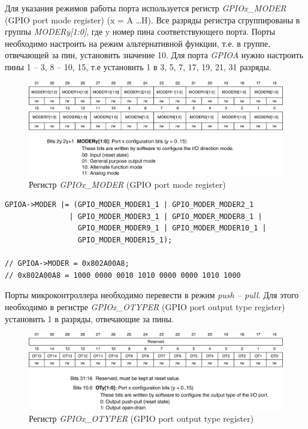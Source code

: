 	Для указания режимов работы порта используется регистр \textit{GPIOx\_MODER} (GPIO port mode register) (x = A \ldots H). Все разряды регистра сгруппированы в группы \textit{MODERy[1:0]}, где y номер пина соответствующего порта. Порты необходимо настроить на режим альтернативной функции, т.е. в группе, отвечающей за пин, установить значение 10. Для порта \textit{GPIOA }нужно настроить пины 1 -- 3, 8 -- 10, 15, т.е установить 1 в 3, 5, 7, 17, 19, 21, 31 разряды. 


\begin{figure}[H]
\begin{center}
\includegraphics[scale=0.25]{Image/39.jpg} 
\end{center}
\caption{Регистр \textit{GPIOx\_MODER} (GPIO port mode register)}
\end{figure}
\begin{verbatim}
GPIOA->MODER |= (GPIO_MODER_MODER1_1 | GPIO_MODER_MODER2_1 
               | GPIO_MODER_MODER3_1 | GPIO_MODER_MODER8_1 |
                 GPIO_MODER_MODER9_1 | GPIO_MODER_MODER10_1 | 
                 GPIO_MODER_MODER15_1);

// GPIOA->MODER = 0x802A00A8;
// 0x802A00A8 = 1000 0000 0010 1010 0000 0000 1010 1000 
\end{verbatim}


Порты микроконтроллера необходимо перевести в режим \textit{push -- pull}. Для этого необходимо в регистре \textit{GPIOx\_OTYPER} (GPIO port output type register) установить 1 в разряды, отвечающие за пины. 
\begin{figure}[H]
\begin{center}
\includegraphics[scale=0.25]{Image/40.jpg} 
\end{center}
\caption{Регистр \textit{GPIOx\_OTYPER} (GPIO port output type register)}
\end{figure}

